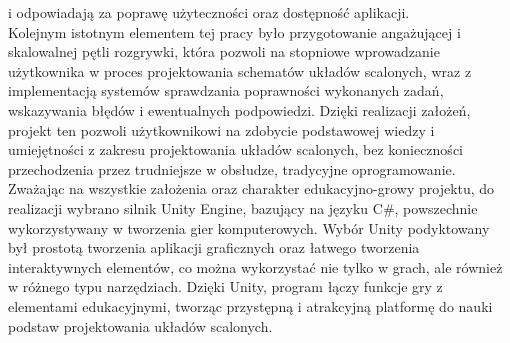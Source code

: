 i odpowiadają za poprawę użyteczności oraz dostępność aplikacji.\\
\indent Kolejnym istotnym elementem tej pracy było przygotowanie angażującej i skalowalnej pętli rozgrywki,
która pozwoli na stopniowe wprowadzanie użytkownika w proces projektowania schematów układów scalonych,
wraz z implementacją systemów sprawdzania poprawności wykonanych zadań, wskazywania błędów i ewentualnych podpowiedzi.
Dzięki realizacji założeń, projekt ten pozwoli użytkownikowi na zdobycie podstawowej wiedzy
i umiejętności z zakresu projektowania układów scalonych,
bez konieczności przechodzenia przez trudniejsze w obsłudze, tradycyjne oprogramowanie.\\
\indent Zważając na wszystkie założenia oraz charakter edukacyjno-growy projektu,
do realizacji wybrano silnik Unity Engine,
bazujący na języku C\#,
powszechnie wykorzystywany w tworzenia gier komputerowych.
Wybór Unity podyktowany był prostotą tworzenia aplikacji graficznych oraz łatwego tworzenia interaktywnych elementów,
co można wykorzystać nie tylko w grach, ale również w różnego typu narzędziach.
Dzięki Unity,
program łączy funkcje gry z elementami edukacyjnymi,
tworząc przystępną i atrakcyjną platformę do nauki podstaw projektowania układów scalonych.
